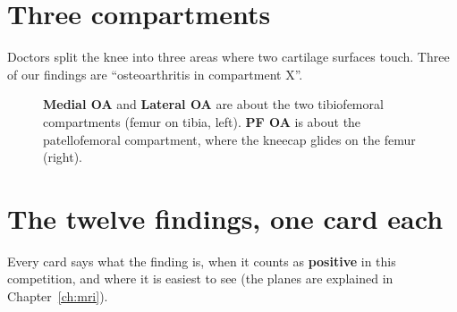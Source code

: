 \section{Three compartments}

Doctors split the knee into three areas where two cartilage surfaces touch. Three of our findings are
``osteoarthritis in compartment X''.

\begin{figure}[H]
\centering
{}\hspace{10mm}
\caption{\textbf{Medial OA} and \textbf{Lateral OA} are about the two tibiofemoral compartments (femur on tibia,
left). \textbf{PF OA} is about the patellofemoral compartment, where the kneecap glides on the femur (right).}
\label{fig:compartments}
\end{figure}

\section{The twelve findings, one card each}

Every card says what the finding is, when it counts as \textbf{positive} in this competition, and where it is
easiest to see (the planes are explained in Chapter~\ref{ch:mri}).

\newcommand{\findingcard}[5]{%
  \begin{tcolorbox}[enhanced, colback=white, colframe=grid, boxrule=0.5pt, arc=1.2mm,
     title={#1}, fonttitle=\bfseries\small, coltitle=ink, colbacktitle=keyfill,
     left=2mm, right=2mm, top=1mm, bottom=1mm, fontupper=\footnotesize]
  #2\par\smallskip
  \textcolor{wordline}{\faCheckCircle}\ \textbf{Positive if:} #3\par
  \textcolor{muted}{\faTimesCircle}\ \textbf{Negative:} #4\par
  \textcolor{accent}{\faEye}\ \textbf{Best seen:} #5
  \end{tcolorbox}}

